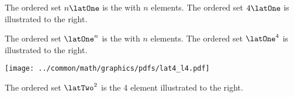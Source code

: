 \begin{minipage}{\tw-35mm}
\begin{example}
\footnotemark
The ordered set $n\latOne$ is the  with $n$ elements.
The ordered set $4\latOne$ is illustrated to the right.
\end{example}
\end{minipage}%
%
\begin{minipage}{3\tw/16}\center%
\end{minipage}

\begin{minipage}{\tw-35mm}
\begin{example}
The ordered set $\latOne^n$ is the  with $n$ elements.
The ordered set $\latOne^4$ is illustrated to the right.
\end{example}
\end{minipage}%
\hfill\texttt{[image: ../common/math/graphics/pdfs/lat4\_l4.pdf]}\hfill\mbox{}\\%

\begin{minipage}{\tw-35mm}
\begin{example}
The ordered set $\latTwo^2$ is the 4 element  illustrated to the right.
\end{example}
\end{minipage}%
\begin{minipage}{3\tw/16}\center%
\end{minipage}

